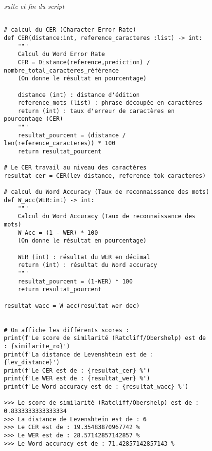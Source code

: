\begin{figure}[h]
\small{\textit{suite et fin du script}}
\begin{lstlisting}

# calcul du CER (Character Error Rate)
def CER(distance:int, reference_caracteres :list) -> int:
	"""
	Calcul du Word Error Rate
	CER = Distance(reference,prediction) / nombre_total_caracteres_référence
	(On donne le résultat en pourcentage)
	
	distance (int) : distance d'édition
	reference_mots (list) : phrase découpée en caractères
	return (int) : taux d'erreur de caractères en pourcentage (CER)
	"""
	resultat_pourcent = (distance / len(reference_caracteres)) * 100
	return resultat_pourcent

# Le CER travail au niveau des caractères
resultat_cer = CER(lev_distance, reference_tok_caracteres)

# calcul du Word Accuracy (Taux de reconnaissance des mots)
def W_acc(WER:int) -> int:
	"""
	Calcul du Word Accuracy (Taux de reconnaissance des mots)
	W_Acc = (1 - WER) * 100 
	(On donne le résultat en pourcentage)
	
	WER (int) : résultat du WER en décimal
	return (int) : résultat du Word accuracy
	"""
	resultat_pourcent = (1-WER) * 100
	return resultat_pourcent

resultat_wacc = W_acc(resultat_wer_dec)


# On affiche les différents scores :
print(f'Le score de similarité (Ratcliff/Obershelp) est de : {similarite_ro}')
print(f'La distance de Levenshtein est de : {lev_distance}')
print(f'Le CER est de : {resultat_cer} %')
print(f'Le WER est de : {resultat_wer} %')
print(f'Le Word accuracy est de : {resultat_wacc} %')

>>> Le score de similarité (Ratcliff/Obershelp) est de : 0.8333333333333334
>>> La distance de Levenshtein est de : 6
>>> Le CER est de : 19.35483870967742 %
>>> Le WER est de : 28.57142857142857 %
>>> Le Word accuracy est de : 71.42857142857143 %
\end{lstlisting}
\end{figure}

